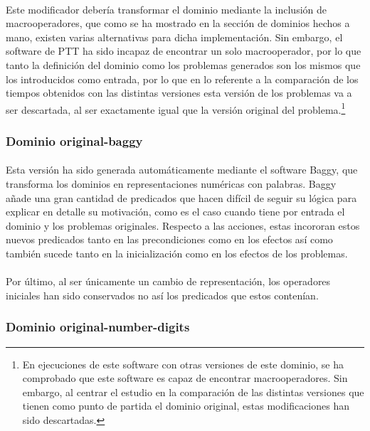\documentclass{article}
\begin{document}
\paragraph{}
Este modificador debería transformar el dominio mediante la inclusión de macrooperadores, que como se ha mostrado en la sección de dominios hechos a mano, existen varias alternativas para dicha implementación. Sin embargo, el software de PTT ha sido incapaz de encontrar un solo macrooperador, por lo que tanto la definición del dominio como los problemas generados son los mismos que los introducidos como entrada, por lo que en lo referente a la comparación de los tiempos obtenidos con las distintas versiones esta versión de los problemas va a ser descartada, al ser exactamente igual que la versión original del problema.\footnote{En ejecuciones de este software con otras versiones de este dominio, se ha comprobado que este software es capaz de encontrar macrooperadores. Sin embargo, al centrar el estudio en la comparación de las distintas versiones que tienen como punto de partida el dominio original, estas modificaciones han sido descartadas.}

\subsubsection{Dominio original-baggy}
\paragraph{}
Esta versión ha sido generada automáticamente mediante el software Baggy, que transforma los dominios en representaciones numéricas con palabras. Baggy añade una gran cantidad de predicados que hacen difícil de seguir su lógica para explicar en detalle su motivación, como es el caso cuando tiene por entrada el dominio y los problemas originales. Respecto a las acciones, estas incororan estos nuevos predicados tanto en las precondiciones como en los efectos así como también sucede tanto en la inicialización como en los efectos de los problemas.

\paragraph{}
Por último, al ser únicamente un cambio de representación, los operadores iniciales han sido conservados no así los predicados que estos contenían.

\subsubsection{Dominio original-number-digits}
\end{document}
